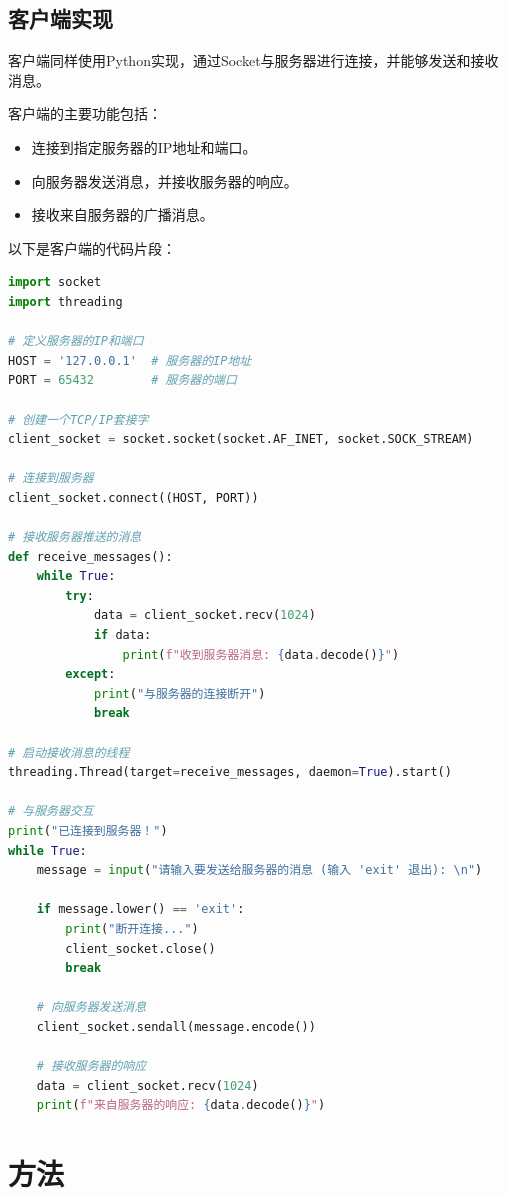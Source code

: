 \documentclass[12pt]{article}
\begin{document}
\subsection{客户端实现}
客户端同样使用Python实现，通过Socket与服务器进行连接，并能够发送和接收消息。

客户端的主要功能包括：
\begin{itemize}
    \item 连接到指定服务器的IP地址和端口。
    \item 向服务器发送消息，并接收服务器的响应。
    \item 接收来自服务器的广播消息。
\end{itemize}

以下是客户端的代码片段：
\begin{lstlisting}[language=Python, caption=客户端代码片段]
import socket
import threading

# 定义服务器的IP和端口
HOST = '127.0.0.1'  # 服务器的IP地址
PORT = 65432        # 服务器的端口

# 创建一个TCP/IP套接字
client_socket = socket.socket(socket.AF_INET, socket.SOCK_STREAM)

# 连接到服务器
client_socket.connect((HOST, PORT))

# 接收服务器推送的消息
def receive_messages():
    while True:
        try:
            data = client_socket.recv(1024)
            if data:
                print(f"收到服务器消息: {data.decode()}")
        except:
            print("与服务器的连接断开")
            break

# 启动接收消息的线程
threading.Thread(target=receive_messages, daemon=True).start()

# 与服务器交互
print("已连接到服务器！")
while True:
    message = input("请输入要发送给服务器的消息 (输入 'exit' 退出): \n")

    if message.lower() == 'exit':
        print("断开连接...")
        client_socket.close()
        break

    # 向服务器发送消息
    client_socket.sendall(message.encode())

    # 接收服务器的响应
    data = client_socket.recv(1024)
    print(f"来自服务器的响应: {data.decode()}")

\end{lstlisting}

\section{方法}
\end{document}

